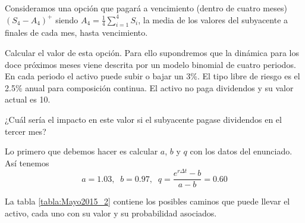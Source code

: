 \begin{problem}[2]
Consideramos una opción que pagará a vencimiento (dentro de cuatro meses) $(S_4-A_4)^+$ siendo $A_4=\frac{1}{4}\sum_{i=1}^4S_i$, la media de los valores del subyacente a finales de cada mes, hasta vencimiento.

\ppart Calcular el valor de esta opción. Para ello supondremos que la dinámica para los doce próximos meses viene descrita por un modelo binomial de cuatro periodos. En cada periodo el activo puede subir o bajar un 3\%. El tipo libre de riesgo es el 2.5\% anual para composición continua. El activo no paga dividendos y su valor actual es 10.

\ppart ¿Cuál sería el impacto en este valor si el subyacente pagase dividendos en el tercer mes?

\solution


\spart

Lo primero que debemos hacer es calcular $a$, $b$ y $q$ con los datos del enunciado. Así tenemos
\[a=1.03, \;\; b = 0.97, \;\; q = \frac{e^{rΔt}-b}{a-b} = 0.60 \]

La tabla \ref{tabla:Mayo2015_2} contiene los posibles caminos que puede llevar el activo, cada uno con su valor y su probabilidad asociados.


\end{problem}
